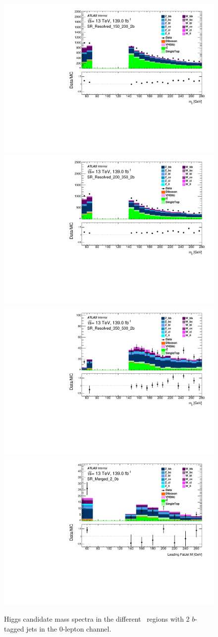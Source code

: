 \begin{figure}[!htb]
    \includegraphics[width=0.46\linewidth]{chapters/c8/figures/0L/DataMC_MonoH_Nominal_SR_Resolved_150_200_2b_m_jj_10GeV.pdf}
    \includegraphics[width=0.46\linewidth]{chapters/c8/figures/0L/DataMC_MonoH_Nominal_SR_Resolved_200_350_2b_m_jj_10GeV.pdf}\\
    \includegraphics[width=0.46\linewidth]{chapters/c8/figures/0L/DataMC_MonoH_Nominal_SR_Resolved_350_500_2b_m_jj_10GeV.pdf}
    \includegraphics[width=0.46\linewidth]{chapters/c8/figures/0L/DataMC_MonoH_Nominal_SR_Merged_2_0b_fatjets_m1_20GeV.pdf}
    \caption{Higgs candidate mass spectra in the different \met~regions with 2 $b$-tagged jets in the 0-lepton channel.}
    \label{fig:data-mc-0l-mjj-2b}
\end{figure}

